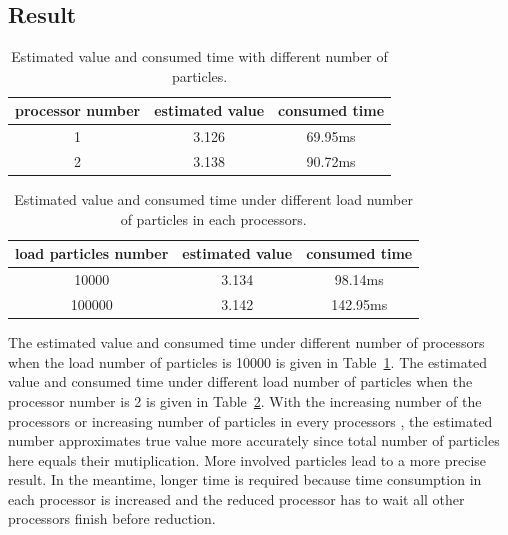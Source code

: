 \documentclass[10pt,twocolumn,letterpaper]{article}
\begin{document}
    \subsection{Result}
    \begin{table}
        \begin{center}
        \begin{tabular}{|c|c|c|}
        \hline
        processor number  &  estimated value & consumed time \\
        \hline
        1 &  3.126 & 69.95ms\\
        2 & 3.138 &  90.72ms\\
        \hline
        \end{tabular}
        \end{center}
        \caption{Estimated value and consumed time with different number of particles.}
        \label{process_number}
    \end{table}
    \begin{table}
        \begin{center}
        \begin{tabular}{|c|c|c|}
        \hline
        load particles number  &  estimated value & consumed time \\
        \hline
        10000 &  3.134 & 98.14ms\\
        100000 & 3.142 & 142.95ms\\
        \hline
        \end{tabular}
        \end{center}
        \caption{Estimated value and consumed time under different load number of particles in 
        each processors.}
        \label{load_number}
    \end{table}
    
    The estimated value and consumed time under different number of processors when the load number of particles 
    is 10000 is given in Table~\ref{process_number}. The estimated value and consumed time
    under different load number of particles when the processor number is 2 is given in Table~\ref{load_number}.
    With the increasing number of the processors or increasing number of particles in every processors
    , the estimated number approximates true value more accurately since total number of particles here equals
    their mutiplication. More involved particles lead to a more precise result. In the meantime, longer
    time is required because time consumption in each processor is increased and the reduced processor has to wait all other processors finish before 
    reduction. 
\end{document}
